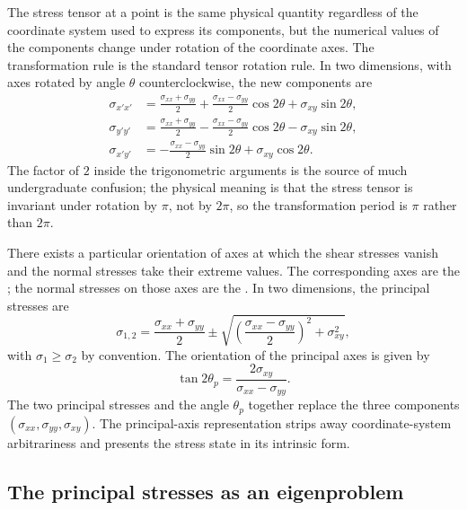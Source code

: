 The stress tensor at a point is the same physical quantity regardless
of the coordinate system used to express its components, but the
numerical values of the components change under rotation of the
coordinate axes. The transformation rule is the standard tensor
rotation rule. In two dimensions, with axes rotated by angle $\theta$
counterclockwise, the new components are
\begin{align*}
\sigma_{x'x'} &= \frac{\sigma_{xx} + \sigma_{yy}}{2} +
\frac{\sigma_{xx} - \sigma_{yy}}{2}\cos 2\theta + \sigma_{xy}\sin
2\theta, \\
\sigma_{y'y'} &= \frac{\sigma_{xx} + \sigma_{yy}}{2} -
\frac{\sigma_{xx} - \sigma_{yy}}{2}\cos 2\theta - \sigma_{xy}\sin
2\theta, \\
\sigma_{x'y'} &= -\frac{\sigma_{xx} - \sigma_{yy}}{2}\sin 2\theta +
\sigma_{xy}\cos 2\theta.
\end{align*}
The factor of $2$ inside the trigonometric arguments is the source of
much undergraduate confusion; the physical meaning is that the
stress tensor is invariant under rotation by $\pi$, not by $2\pi$, so
the transformation period is $\pi$ rather than $2\pi$.

There exists a particular orientation of axes at which the shear
stresses vanish and the normal stresses take their extreme values.
The corresponding axes are the ; the normal
stresses on those axes are the . In two
dimensions, the principal stresses are
\[
\sigma_{1,2} = \frac{\sigma_{xx} + \sigma_{yy}}{2} \pm \sqrt{\left(
\frac{\sigma_{xx} - \sigma_{yy}}{2}\right)^2 + \sigma_{xy}^2},
\]
with $\sigma_1 \geq \sigma_2$ by convention. The orientation of the
principal axes is given by
\[
\tan 2\theta_p = \frac{2 \sigma_{xy}}{\sigma_{xx} - \sigma_{yy}}.
\]
The two principal stresses and the angle $\theta_p$ together replace
the three components $(\sigma_{xx}, \sigma_{yy}, \sigma_{xy})$. The
principal-axis representation strips away coordinate-system
arbitrariness and presents the stress state in its intrinsic form.



\subsection{The principal stresses as an eigenproblem}


